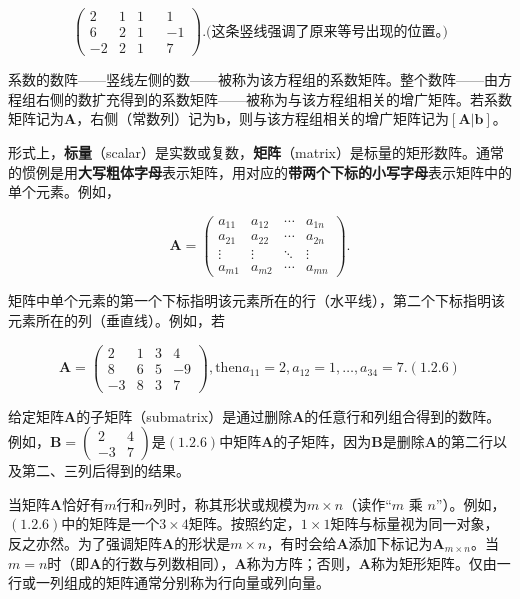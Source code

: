 \[\begin{pmatrix}2&1&1&&1\\6&2&1&&-1\\-2&2&1&&7\end{pmatrix}. \text{(这条竖线强调了原来等号出现的位置。)}\]

系数的数阵——竖线左侧的数——被称为该方程组的\(\boxed{\text{系数矩阵}}\)。整个数阵——由方程组右侧的数扩充得到的系数矩阵——被称为与该方程组相关的\(\boxed{\text{增广矩阵}}\)。若系数矩阵记为\(\mathbf{A}\)，右侧（常数列）记为\(\mathbf{b}\)，则与该方程组相关的增广矩阵记为\([\mathbf{A}|\mathbf{b}]\)。

形式上，\textbf{标量}（scalar）是实数或复数，\textbf{矩阵}（matrix）是标量的矩形数阵。通常的惯例是用\textbf{大写粗体字母}表示矩阵，用对应的\textbf{带两个下标的小写字母}表示矩阵中的单个元素。例如，

\[
\mathbf{A} = \begin{pmatrix}
	a_{11} & a_{12} & \cdots & a_{1n} \\
	a_{21} & a_{22} & \cdots & a_{2n} \\
	\vdots & \vdots & \ddots & \vdots \\
	a_{m1} & a_{m2} & \cdots & a_{mn}
\end{pmatrix}.
\]

矩阵中单个元素的第一个下标指明该元素所在的\(\boxed{\text{行}}\)（水平线），第二个下标指明该元素所在的\(\boxed{\text{列}}\)（垂直线）。例如，若

\[\mathbf{A}=\begin{pmatrix}2&1&3&4\\8&6&5&-9\\-3&8&3&7\end{pmatrix}, \mathrm{then} a_{11}=2,a_{12}=1,\ldots,a_{34}=7. (1.2.6)\]

给定矩阵\(\mathbf{A}\)的\(\boxed{\text{子矩阵}}\)（submatrix）是通过删除\(\mathbf{A}\)的任意行和列组合得到的数阵。例如，\(\mathbf{B} = \begin{pmatrix} 2 & 4 \\ -3 & 7 \end{pmatrix}\)是\((1.2.6)\)中矩阵\(\mathbf{A}\)的子矩阵，因为\(\mathbf{B}\)是删除\(\mathbf{A}\)的第二行以及第二、三列后得到的结果。

当矩阵\(\mathbf{A}\)恰好有\( m \)行和\( n \)列时，称其\(\boxed{\text{形状}}\)或\(\boxed{\text{规模}}\)为\( m \times n \)（读作“\( m \) 乘 \( n \)”）。例如，\((1.2.6)\)中的矩阵是一个\( 3 \times 4 \)矩阵。按照约定，\( 1 \times 1 \)矩阵与标量视为同一对象，反之亦然。为了强调矩阵\(\mathbf{A}\)的形状是\( m \times n \)，有时会给\(\mathbf{A}\)添加下标记为\(\mathbf{A}_{m \times n}\)。当\( m = n \)时（即\(\mathbf{A}\)的行数与列数相同），\(\mathbf{A}\)称为\(\boxed{\text{方阵}}\)；否则，\(\mathbf{A}\)称为\(\boxed{\text{矩形矩阵}}\)。仅由一行或一列组成的矩阵通常分别称为\(\boxed{\text{行向量}}\)或\(\boxed{\text{列向量}}\)。

